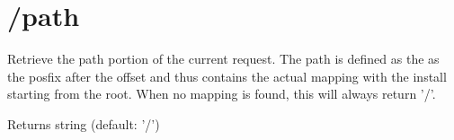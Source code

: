 \hypertarget{_2path-example}{\section{/path}
}
Retrieve the path portion of the current request. The path is defined as the as the posfix after the offset and thus contains the actual mapping with the install starting from the root. When no mapping is found, this will always return '/'.

\begin{DoxyReturn}{Returns}
string (default\-: '/')
\end{DoxyReturn}

\begin{DoxyCodeInclude}
\end{DoxyCodeInclude}
 
